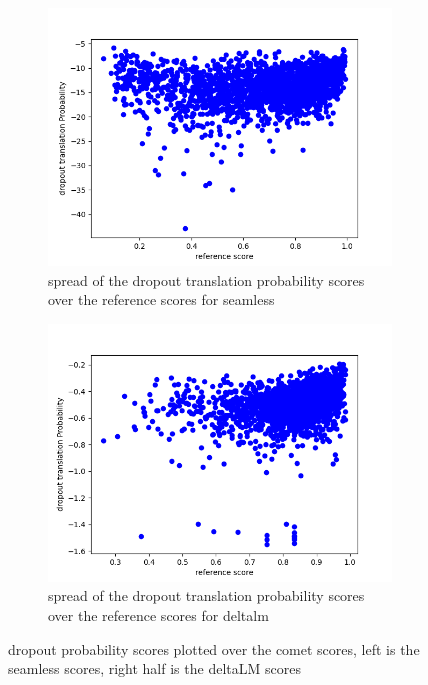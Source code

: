 \begin{figure}[ht]
    \centering%
    \begin{subfigure}{0.4\linewidth}
        \includegraphics[width=\textwidth]{Latex/sections/images/seamlessdropprob.png}
        \caption{spread of the dropout translation probability scores over the reference scores for seamless}
    \end{subfigure}
    \begin{subfigure}{0.4\linewidth}
        \includegraphics[width=\textwidth]{Latex/sections/images/dlmdropprob.png}
        \caption{spread of the dropout translation probability scores over the reference scores for deltalm}
    \end{subfigure}
        \caption{dropout probability scores plotted over the comet scores, left is the seamless scores, right half is the deltaLM scores}
        \label{fig:dropout translation probability scores}
    \end{figure}

